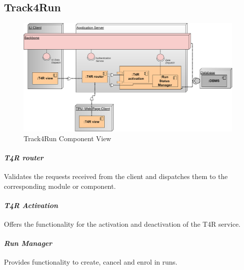 \subsection{Track4Run}
\label{subsect:T4RComponentView}
\begin{figure}[H]
\caption{Track4Run Component View}
\centering
\includegraphics[width = \textwidth]{sections/architecturalDesign/T4RDiagram.png}
\end{figure}
\paragraph{\textit{T4R router}} Validates the requests received from the client and dispatches them to the corresponding module or component.
\paragraph{\textit{T4R Activation}} Offers the functionality for the activation and deactivation of the T4R service.
\paragraph{\textit{Run Manager}} Provides functionality to create, cancel and enrol in runs.
